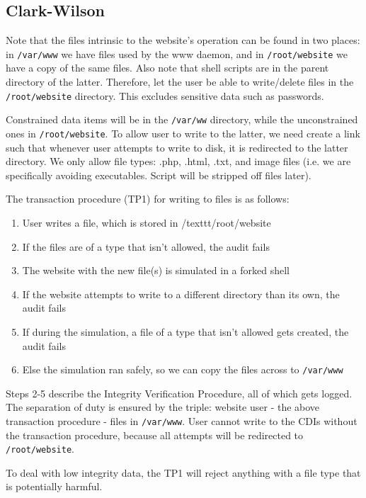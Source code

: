 \documentclass[11pt,journal]{article}
\begin{document}
	\subsection{Clark-Wilson}
	Note that the files intrinsic to the website's operation can be found in two places: in \texttt{/var/www} we have files used by the www daemon, and in \texttt{/root/website} we have a copy of the same files. Also note that shell scripts are in the parent directory of the latter. Therefore, let the user be able to write/delete files in the \texttt{/root/website} directory. This excludes sensitive data such as passwords.
	
	Constrained data items will be in the \texttt{/var/ww} directory, while the unconstrained ones in \texttt{/root/website}. To allow user to write to the latter, we need create a link such that whenever user attempts to write to disk, it is redirected to the latter directory. We only allow file types: .php, .html, .txt, and image files (i.e. we are specifically avoiding executables. Script will be stripped off files later).
	
	The transaction procedure (TP1) for writing to files is as follows:
	\begin{enumerate}
		\item User writes a file, which is stored in /texttt{/root/website}
		\item If the files are of a type that isn't allowed, the audit fails
		\item The website with the new file(s) is simulated in a forked shell
		\item If the website attempts to write to a different directory than its own, the audit fails
		\item If during the simulation, a file of a type that isn't allowed gets created, the audit fails
		\item Else the simulation ran safely, so we can copy the files across to \texttt{/var/www}
	\end{enumerate}

	Steps 2-5 describe the Integrity Verification Procedure, all of which gets logged. The separation of duty is ensured by the triple: website user - the above transaction procedure - files in \texttt{/var/www}. User cannot write to the CDIs without the transaction procedure, because all attempts will be redirected to \texttt{/root/website}.
	
	To deal with low integrity data, the TP1 will reject anything with a file type that is potentially harmful.
	
\end{document}
